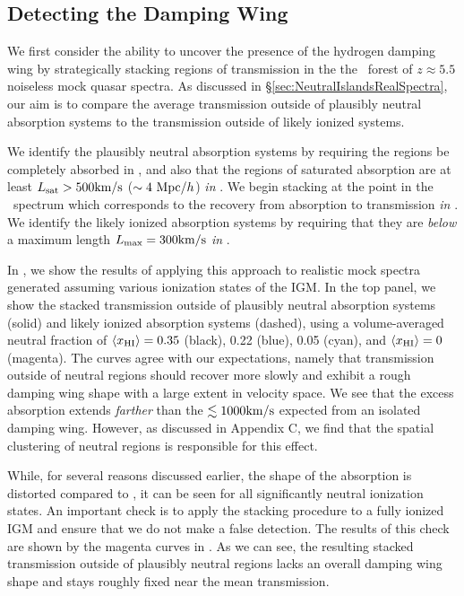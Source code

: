 \subsection{Detecting the Damping Wing} \label{sec:NeutralIslandsDamping Wing Results}



We first consider the ability to uncover the presence of the hydrogen damping wing by strategically stacking regions of transmission in the the \lya\ forest of $z \approx 5.5$ noiseless mock quasar spectra. As discussed in \S \ref{sec:NeutralIslandsRealSpectra}, our aim is to compare the average transmission outside of plausibly neutral absorption systems to the transmission outside of likely ionized systems. 


We identify the plausibly neutral absorption systems by requiring the regions be completely absorbed in \lyb, and also that the regions of saturated absorption are at least $L_{\text{sat}} > 500\text{km}/\text{s}$ ($\sim4\ \text{Mpc/$h$}$) \textit{in \lyb}. We begin stacking at the point in the \lya\ spectrum which corresponds to the recovery from absorption to transmission \textit{in \lyb}. We identify the likely ionized absorption systems by requiring that they are \textit{below} a maximum length $L_{\text{max}} = 300\text{km}/\text{s}$ \textit{in \lyb}.


In , we show the results of applying this approach to realistic mock spectra generated assuming various ionization states of the IGM. In the top panel, we show the stacked transmission outside of plausibly neutral absorption systems (solid) and likely ionized absorption systems (dashed), using a volume-averaged neutral fraction of $\langle x_{\text{HI}}\rangle = 0.35$ (black), 0.22 (blue), 0.05 (cyan), and $\langle x_{\text{HI}}\rangle = 0$ (magenta). The curves agree with our expectations, namely that transmission outside of neutral regions should recover more slowly and exhibit a rough damping wing shape with a large extent in velocity space. We see that the excess absorption extends \textit{farther} than the $\lesssim 1000\text{km}/\text{s}\ $expected from an isolated damping wing. However, as discussed in Appendix C, we find that the spatial clustering of neutral regions is responsible for this effect. 


While, for several reasons discussed earlier, the shape of the absorption is distorted compared to , it can be seen for all significantly neutral ionization states. An important check is to apply the stacking procedure to a fully ionized IGM and ensure that we do not make a false detection. The results of this check are shown by the magenta curves in . As we can see, the resulting stacked transmission outside of plausibly neutral regions lacks an overall damping wing shape and stays roughly fixed near the mean transmission. 


